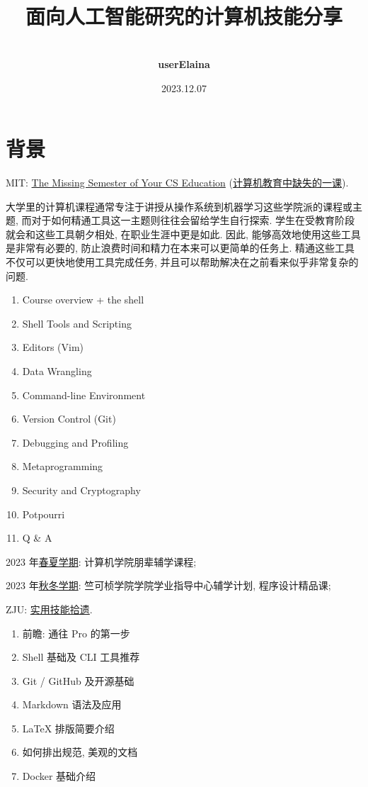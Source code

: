 \documentclass[a4paper]{article}
\title{
    \vspace*{1.0in}
     \\
    \vspace*{1in}
    \textbf{\Huge 面向人工智能研究的计算机技能分享}
    \vspace{0.5in}
}
\author{ \\
    \textbf{\huge userElaina} \\
    \vspace*{1in}
}
\date{\LARGE 2023.12.07}
\begin{document}
\LARGE

\maketitle
\tableofcontents
\thispagestyle{empty}
\newpage

\section{\LARGE 背景}

MIT: \href{https://missing.csail.mit.edu/}{The Missing Semester of Your CS Education} (\href{https://missing-semester-cn.github.io/}{计算机教育中缺失的一课}).

大学里的计算机课程通常专注于讲授从操作系统到机器学习这些学院派的课程或主题, 而对于如何精通工具这一主题则往往会留给学生自行探索. 学生在受教育阶段就会和这些工具朝夕相处, 在职业生涯中更是如此. 因此, 能够高效地使用这些工具是非常有必要的, 防止浪费时间和精力在本来可以更简单的任务上. 精通这些工具不仅可以更快地使用工具完成任务, 并且可以帮助解决在之前看来似乎非常复杂的问题.

\begin{enumerate}[leftmargin=2cm, itemindent=1cm]
    \item Course overview + the shell
    \item Shell Tools and Scripting
    \item Editors (Vim)
    \item Data Wrangling
    \item Command-line Environment
    \item Version Control (Git)
    \item Debugging and Profiling
    \item Metaprogramming
    \item Security and Cryptography
    \item Potpourri
    \item Q \& A
\end{enumerate}

2023 年\href{https://www.bilibili.com/video/BV1T84y1w7wB}{春夏学期}: 计算机学院朋辈辅学课程;

2023 年\href{https://www.bilibili.com/video/BV1t34y1g7YU}{秋冬学期}: 竺可桢学院学院学业指导中心辅学计划, 程序设计精品课;

ZJU: \href{https://slides.tonycrane.cc/PracticalSkillsTutorial/}{实用技能拾遗}.

\begin{enumerate}[leftmargin=2cm, itemindent=1cm]
    \item 前瞻: 通往 Pro 的第一步
    \item Shell 基础及 CLI 工具推荐
    \item Git / GitHub 及开源基础
    \item Markdown 语法及应用
    \item LaTeX 排版简要介绍
    \item 如何排出规范, 美观的文档
    \item Docker 基础介绍
\end{enumerate}
\end{document}
